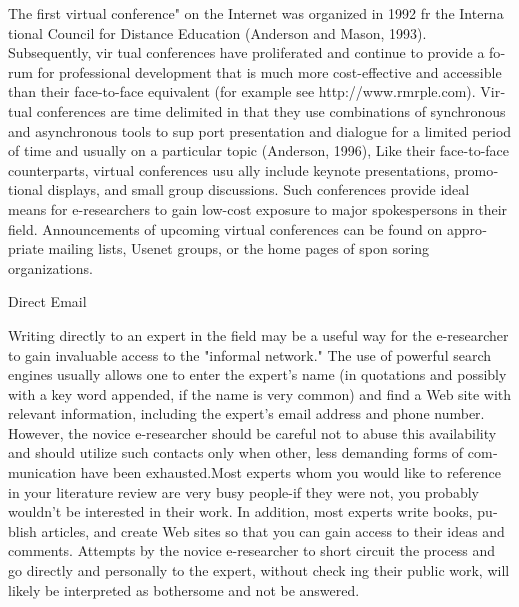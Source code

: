 \documentclass[a4paper,12pt]{article}
\begin{document}
\begin{latin}
\noindent
The first  virtual conference" on  the  Internet was organized in  1992 fr the  Interna­ tional Council for  Distance Education (Anderson and Mason,  1993). Subsequently, vir­ tual conferences have proliferated and  continue to provide a forum   for  professional development that is much more cost-effective and  accessible than   their face-to-face equivalent (for example see  http://www.rmrple.com). Virtual conferences are   time­
delimited in that  they  use combinations of synchronous and asynchronous tools to sup­ port presentation and dialogue for a limited period of time  and  usually  on a particular topic (Anderson, 1996), Like  their face-to-face counterparts, virtual conferences usu­ ally include keynote presentations, promotional displays, and  small  group discussions. Such  conferences provide ideal  means  for  e-researchers to gain  low-cost exposure to major spokespersons in their field.  Announcements of upcoming virtual conferences can be found on appropriate mailing lists,  Usenet groups, or the  home pages  of spon­ soring organizations.


\vspace{0.1cm}
\vspace{0.1cm}
\vspace{0.1cm}

Direct Email

\noindent
Writing directly to an  expert in  the  field  may  be a useful  way  for  the e-researcher to gain  invaluable access  to the  "informal network." The  use of powerful search engines usually  allows one to enter the  expert's  name (in  quotations and   possibly with   a key word  appended, if the  name  is very common) and  find  a Web site  with relevant information, including the expert's email address and phone number. However, the novice e-researcher should be careful not to abuse this availability and should  utilize such contacts only when other, less  demanding forms of communication  have  been exhausted.Most experts whom you would like to reference in your literature review are very busy people-if they  were not, you probably wouldn't be interested in their work. In addition, most experts write books, publish articles, and create Web sites so that you can  gain  access to their ideas and comments. Attempts by the novice e-researcher to short circuit the  process and  go directly and  personally to the  expert,  without check­ ing  their public work, will  likely  be interpreted as bothersome and not be answered.
\vspace{0.1cm}
\vspace{0.1cm}
\vspace{0.1cm}



\end{latin}
\end{document}
